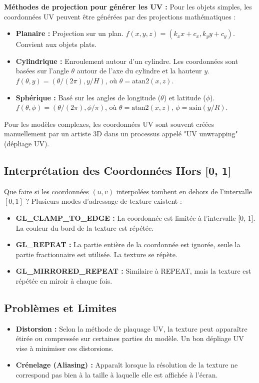 \documentclass{article}
\begin{document}
\textbf{Méthodes de projection pour générer les UV :}
Pour les objets simples, les coordonnées UV peuvent être générées par des projections mathématiques :
\begin{itemize}
    \item \textbf{Planaire :} Projection sur un plan. $f(x, y, z) = (k_x x + c_x, k_y y + c_y)$. Convient aux objets plats.
    \item \textbf{Cylindrique :} Enroulement autour d'un cylindre. Les coordonnées sont basées sur l'angle $\theta$ autour de l'axe du cylindre et la hauteur $y$. $f(\theta, y) = (\theta / (2\pi), y/H)$, où $\theta = \text{atan2}(x, z)$.
    \item \textbf{Sphérique :} Basé sur les angles de longitude ($\theta$) et latitude ($\phi$). $f(\theta, \phi) = (\theta / (2\pi), \phi / \pi)$, où $\theta = \text{atan2}(x, z)$, $\phi = \text{asin}(y/R)$.
\end{itemize}
Pour les modèles complexes, les coordonnées UV sont souvent créées manuellement par un artiste 3D dans un processus appelé "UV unwrapping" (dépliage UV).

\subsection{Interprétation des Coordonnées Hors [0, 1]}
Que faire si les coordonnées $(u, v)$ interpolées tombent en dehors de l'intervalle $[0, 1]$ ? Plusieurs modes d'adressage de texture existent :
\begin{itemize}
    \item \textbf{GL\_CLAMP\_TO\_EDGE :} La coordonnée est limitée à l'intervalle [0, 1]. La couleur du bord de la texture est répétée.
    \item \textbf{GL\_REPEAT :} La partie entière de la coordonnée est ignorée, seule la partie fractionnaire est utilisée. La texture se répète.
    \item \textbf{GL\_MIRRORED\_REPEAT :} Similaire à REPEAT, mais la texture est répétée en miroir à chaque fois.
\end{itemize}

\subsection{Problèmes et Limites}
\begin{itemize}
    \item \textbf{Distorsion :} Selon la méthode de plaquage UV, la texture peut apparaître étirée ou compressée sur certaines parties du modèle. Un bon dépliage UV vise à minimiser ces distorsions.
    \item \textbf{Crénelage (Aliasing) :} Apparaît lorsque la résolution de la texture ne correspond pas bien à la taille à laquelle elle est affichée à l'écran.
\end{itemize}
\end{document}
